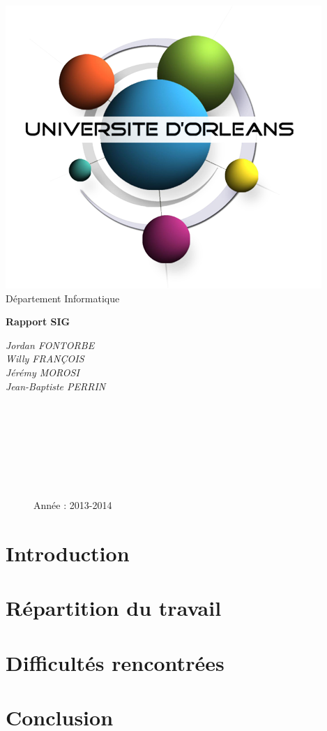 \documentclass[12pt,a4paper,oneside]{article}
\begin{document}
\begin{titlepage}
\begin{flushright}
           \includegraphics[scale=0.30]{../images/univorleans.png}\\ 
                      Département Informatique
\end{flushright}
\vspace{30mm}
\begin{center}
\textbf{\huge{Rapport SIG }}\\
\vspace{8mm}
\begin{large}
	\textit{Jordan FONTORBE}\\
	\textit{Willy FRANÇOIS}\\
	\textit{Jérémy MOROSI}\\
	\textit{Jean-Baptiste PERRIN}
\end{large}

\end{center}
\begin{figure}[b!]
\begin{flushright}
~~\\ ~~\\ ~~\\ ~~\\ ~~\\ ~~\\ ~~\\
\large{Année : 2013-2014}
\end{flushright}
\end{figure}
\end{titlepage}

\newpage

\tableofcontents
\newpage

\section{Introduction}

\section{Répartition du travail}

\section{Difficultés rencontrées}

\section{Conclusion}


\appendix
\end{document}
